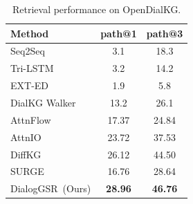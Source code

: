 
\begin{table}
\centering
\small
\begin{tabular}{l|cc}
\toprule
    Method& path@1&path@3\\
     \midrule
     \midrule
     Seq2Seq   & 3.1&18.3\\
     Tri-LSTM  & 3.2 & 14.2 \\
     EXT-ED  & 1.9 & 5.8 \\
     DialKG Walker & 13.2 & 26.1 \\
     AttnFlow & 17.37&24.84 \\
     AttnIO & 23.72& 37.53\\
     DiffKG & 26.12 &44.50 \\
     SURGE &16.76 &28.64 \\
     \midrule
     DialogGSR~(Ours)  & \textbf{28.96}&\textbf{46.76}\\
     \bottomrule
    \end{tabular}
    \vspace{-5pt}
\caption{\label{tab:retrieval}Retrieval performance on OpenDialKG.}
\end{table}